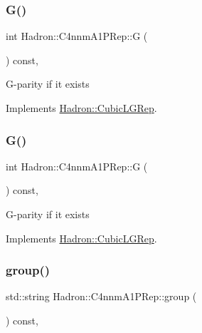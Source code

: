 \subsubsection{\texorpdfstring{G()}{G()}\hspace{0.1cm}{\footnotesize\ttfamily [2/3]}}
{\footnotesize\ttfamily int Hadron\+::\+C4nnm\+A1\+P\+Rep\+::G (\begin{DoxyParamCaption}{ }\end{DoxyParamCaption}) const\hspace{0.3cm}{\ttfamily [inline]}, {\ttfamily [virtual]}}

G-\/parity if it exists 

Implements \mbox{\hyperlink{structHadron_1_1CubicLGRep_ace26f7b2d55e3a668a14cb9026da5231}{Hadron\+::\+Cubic\+L\+G\+Rep}}.

\mbox{\label{structHadron_1_1C4nnmA1PRep_aa2cf1b68b97f5403efa313215bb61fbd}} 
\subsubsection{\texorpdfstring{G()}{G()}\hspace{0.1cm}{\footnotesize\ttfamily [3/3]}}
{\footnotesize\ttfamily int Hadron\+::\+C4nnm\+A1\+P\+Rep\+::G (\begin{DoxyParamCaption}{ }\end{DoxyParamCaption}) const\hspace{0.3cm}{\ttfamily [inline]}, {\ttfamily [virtual]}}

G-\/parity if it exists 

Implements \mbox{\hyperlink{structHadron_1_1CubicLGRep_ace26f7b2d55e3a668a14cb9026da5231}{Hadron\+::\+Cubic\+L\+G\+Rep}}.

\mbox{\label{structHadron_1_1C4nnmA1PRep_aca4b417019aecb9f64613cca8fb4a152}} 
\subsubsection{\texorpdfstring{group()}{group()}\hspace{0.1cm}{\footnotesize\ttfamily [1/3]}}
{\footnotesize\ttfamily std\+::string Hadron\+::\+C4nnm\+A1\+P\+Rep\+::group (\begin{DoxyParamCaption}{ }\end{DoxyParamCaption}) const\hspace{0.3cm}{\ttfamily [inline]}, {\ttfamily [virtual]}}

